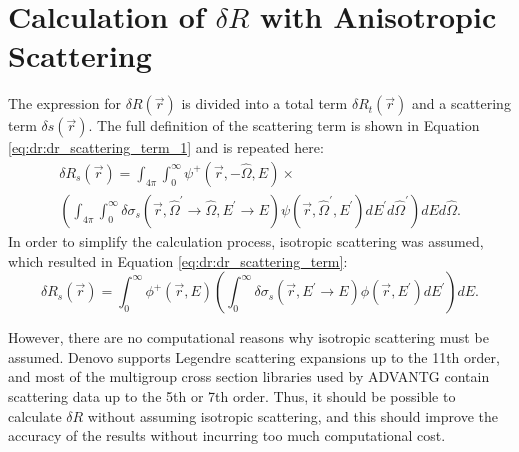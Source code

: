 \section{Calculation of $\delta R$ with Anisotropic Scattering}
\label{sec:proposal:anisotropic_scattering}

The expression for $\delta R\left(\vec{r}\right)$ is divided into a total term $\delta R_t\left(\vec{r}\right)$ and a scattering term $\delta s\left(\vec{r}\right)$.
The full definition of the scattering term is shown in Equation \ref{eq:dr:dr_scattering_term_1} and is repeated here:
\begin{multline*}
  \delta R_s\left(\vec{r}\right) =
  \int_{4\pi}\int_0^\infty\psi^+\left(\vec{r},-\hat{\Omega},E\right) \times \\
  \left(\int_{4\pi}\int_0^\infty\delta\sigma_s\left(\vec{r},\hat{\Omega}^\prime\rightarrow\hat{\Omega},E^\prime\rightarrow E\right)\psi\left(\vec{r},\hat{\Omega}^\prime,E^\prime\right)dE^\prime d\hat{\Omega}^\prime\right)dEd\hat{\Omega}.
\end{multline*}
In order to simplify the calculation process, isotropic scattering was assumed, which resulted in Equation \ref{eq:dr:dr_scattering_term}:
\begin{equation*}
  \delta R_s\left(\vec{r}\right) =
  \int_0^\infty\phi^+\left(\vec{r},E\right)\left(\int_0^\infty\delta\sigma_s\left(\vec{r},E^\prime\rightarrow E\right)\phi\left(\vec{r},E^\prime\right)dE^\prime\right)dE.
\end{equation*}

However, there are no computational reasons why isotropic scattering must be assumed.
Denovo supports Legendre scattering expansions up to the 11th order, and most of the multigroup cross section libraries used by ADVANTG contain scattering data up to the 5th or 7th order.
Thus, it should be possible to calculate $\delta R$ without assuming isotropic scattering, and this should improve the accuracy of the results without incurring too much computational cost.


